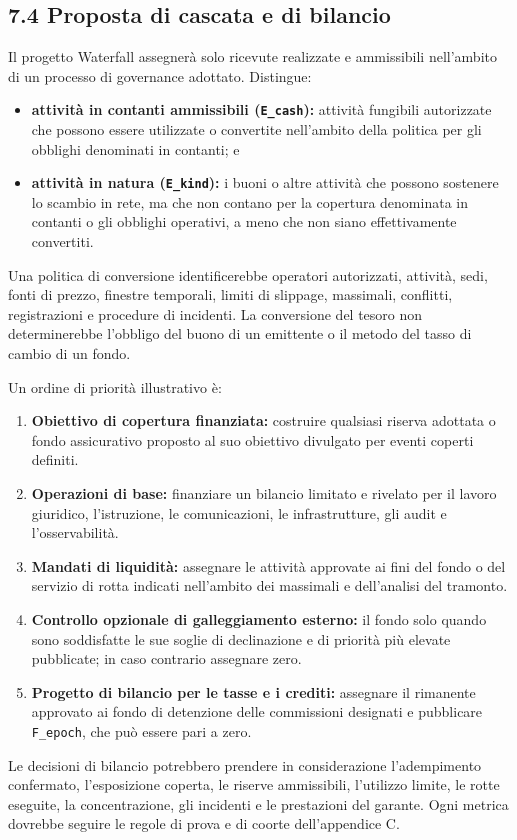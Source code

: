 \documentclass[11pt]{article}
\begin{document}
\subsection*{7.4 Proposta di cascata e di bilancio}

Il progetto Waterfall assegnerà solo ricevute realizzate e ammissibili nell'ambito di un processo di governance adottato. Distingue:

\begin{itemize}[leftmargin=*]
\item \textbf{attività in contanti ammissibili (\texttt{E\_cash}):} attività fungibili autorizzate che possono essere utilizzate o convertite nell'ambito della politica per gli obblighi denominati in contanti; e
\item \textbf{attività in natura (\texttt{E\_kind}):} i buoni o altre attività che possono sostenere lo scambio in rete, ma che non contano per la copertura denominata in contanti o gli obblighi operativi, a meno che non siano effettivamente convertiti.
\end{itemize}
Una politica di conversione identificerebbe operatori autorizzati, attività, sedi, fonti di prezzo, finestre temporali, limiti di slippage, massimali, conflitti, registrazioni e procedure di incidenti. La conversione del tesoro non determinerebbe l'obbligo del buono di un emittente o il metodo del tasso di cambio di un fondo.

Un ordine di priorità illustrativo è:

\begin{enumerate}[leftmargin=*]
\item \textbf{Obiettivo di copertura finanziata:} costruire qualsiasi riserva adottata o fondo assicurativo proposto al suo obiettivo divulgato per eventi coperti definiti.
\item \textbf{Operazioni di base:} finanziare un bilancio limitato e rivelato per il lavoro giuridico, l'istruzione, le comunicazioni, le infrastrutture, gli audit e l'osservabilità.
\item \textbf{Mandati di liquidità:} assegnare le attività approvate ai fini del fondo o del servizio di rotta indicati nell'ambito dei massimali e dell'analisi del tramonto.
\item \textbf{Controllo opzionale di galleggiamento esterno:} il fondo solo quando sono soddisfatte le sue soglie di declinazione e di priorità più elevate pubblicate; in caso contrario assegnare zero.
\item \textbf{Progetto di bilancio per le tasse e i crediti:} assegnare il rimanente approvato ai fondo di detenzione delle commissioni designati e pubblicare \texttt{F\_epoch}, che può essere pari a zero.
\end{enumerate}
Le decisioni di bilancio potrebbero prendere in considerazione l'adempimento confermato, l'esposizione coperta, le riserve ammissibili, l'utilizzo limite, le rotte eseguite, la concentrazione, gli incidenti e le prestazioni del garante. Ogni metrica dovrebbe seguire le regole di prova e di coorte dell'appendice C.
\end{document}
